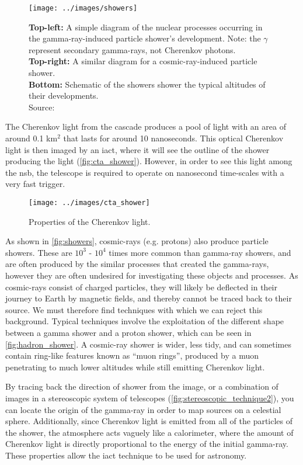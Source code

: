 \documentclass[%
amsmath,amssymb,
onecolumn,
a4paper,
10pt
]{article}%
\newcommand{\quotes}[1]{``#1''}
\begin{document}
	\begin{figure}
		\centering
		\texttt{[image: ../images/showers]}
		\caption{\label{fig:showers}\textbf{Top-left:} A simple diagram of the nuclear processes occurring in the gamma-ray-induced particle shower's development. Note: the $\gamma$ represent secondary gamma-rays, not Cherenkov photons. \\
			\textbf{Top-right:} A similar diagram for a cosmic-ray-induced particle shower. \\
			\textbf{Bottom:} Schematic of the showers shower the typical altitudes of their developments. \\
			Source: \citep[p.~16]{weekes2003}}
	\end{figure}

	The Cherenkov light from the cascade produces a pool of light with an area of around 0.1 km$^2$ that lasts for around 10 nanoseconds. This optical Cherenkov light is then imaged by an \gls{iact}, where it will see the outline of the shower producing the light (\autoref{fig:cta_shower}). However, in order to see this light among the \gls{nsb}, the telescope is required to operate on nanosecond time-scales with a very fast trigger.
	
	\begin{figure}
		\centering
		\texttt{[image: ../images/cta\_shower]}
		\caption{\label{fig:cta_shower}Properties of the Cherenkov light.}
	\end{figure}

	As shown in \autoref{fig:showers}, cosmic-rays (e.g. protons) also produce particle showers. These are $10^3$ - $10^4$ times more common than gamma-ray showers, and are often produced by the similar processes that created the gamma-rays, however they are often undesired for investigating these objects and processes. As cosmic-rays consist of charged particles, they will likely be deflected in their journey to Earth by magnetic fields, and thereby cannot be traced back to their source. We must therefore find techniques with which we can reject this background. Typical techniques involve the exploitation of the different shape between a gamma shower and a proton shower, which can be seen in \autoref{fig:hadron_shower}. A cosmic-ray shower is wider, less tidy, and can sometimes contain ring-like features known as \quotes{muon rings}, produced by a muon penetrating to much lower altitudes while still emitting Cherenkov light.
	
	By tracing back the direction of shower from the image, or a combination of images in a stereoscopic system of telescopes (\autoref{fig:stereoscopic_technique2}), you can locate the origin of the gamma-ray in order to map sources on a celestial sphere. Additionally, since Cherenkov light is emitted from all of the particles of the shower, the atmosphere acts vaguely like a calorimeter, where the amount of Cherenkov light is directly proportional to the energy of the initial gamma-ray. These properties allow the \gls{iact} technique to be used for astronomy. 
	
\end{document}
